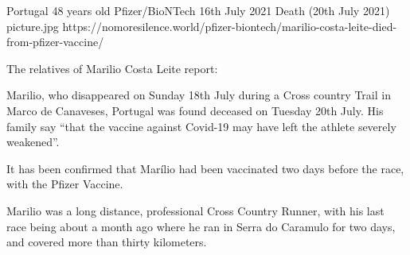 {Portugal}
{48 years old}
{Pfizer/BioNTech}
{16th July 2021}
{Death (20th July 2021)}
{picture.jpg}
{https://nomoresilence.world/pfizer-biontech/marilio-costa-leite-died-from-pfizer-vaccine/}
{

The relatives of Marilio Costa Leite report:

Marilio, who disappeared on Sunday 18th July during a Cross country Trail in
Marco de Canaveses, Portugal was found deceased on Tuesday 20th July. His family
say “that the vaccine against Covid-19 may have left the athlete severely
weakened”.

It has been confirmed that Marílio had been vaccinated two days before the race,
with the Pfizer Vaccine.

Marilio was a long distance, professional Cross Country Runner, with his last
race being about a month ago where he ran in Serra do Caramulo for two days, and
covered more than thirty kilometers.

}
